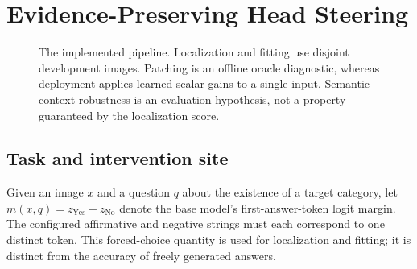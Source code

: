 \section{Evidence-Preserving Head Steering}
\label{sec:method}

\begin{figure}[t]
\centering
{}
\caption{The implemented \method pipeline. Localization and fitting use
disjoint development images. Patching is an offline oracle diagnostic,
whereas deployment applies learned scalar gains to a single input.
Semantic-context robustness is an evaluation hypothesis, not a property
guaranteed by the localization score.}
\label{fig:pipeline}
\end{figure}

\subsection{Task and intervention site}
Given an image $x$ and a question $q$ about the existence of a target
category, let $m(x,q)=z_{\mathrm{Yes}}-z_{\mathrm{No}}$ denote the base model's
first-answer-token logit margin. The configured affirmative and negative
strings must each correspond to one distinct token. This forced-choice
quantity is used for localization and fitting; it is distinct from the
accuracy of freely generated answers.

